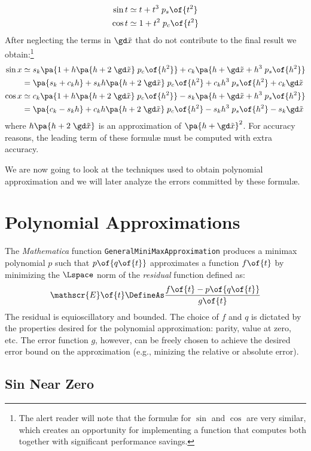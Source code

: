 \documentclass[10pt, a4paper, twoside]{basestyle}
\newcommand{\red}[1]{\tilde{#1}}
\begin{document}
\begin{align*}
\sin t &\simeq t + t^3 \; p_s\of{t^2} \\
\cos t &\simeq 1 + t^2 \; p_c\of{t^2}
\end{align*}
After neglecting the terms in $\gd \red x$ that do not contribute to the final result we obtain:\footnote{The alert reader will note that the formulæ for $\sin$ and $\cos$ are very similar, which creates an opportunity for implementing a function that computes both together with significant performance savings.}
\begin{align*}
\sin x &\simeq s_k \pa{1 + h \pa{h + 2 \; \gd \red x} \; p_c\of{h^2}} + c_k \pa{h + \gd \red x + h^3 \; p_s\of{h^2}} \\
&= \pa{s_k + c_k h} + s_k h \pa{h + 2 \; \gd \red x} \; p_c\of{h^2} + c_k h^3 \; p_s\of{h^2} + c_k \gd \red x \\
\cos x &\simeq c_k \pa{1 + h \pa{h + 2 \; \gd \red x} \; p_c\of{h^2}} - s_k \pa{h + \gd \red x + h^3 \; p_s\of{h^2}} \\
&= \pa{c_k - s_k h} + c_k h \pa{h + 2 \; \gd \red x} \; p_c\of{h^2} - s_k h^3 \; p_s\of{h^2} - s_k \gd \red x
\end{align*}
where $h \pa{h + 2 \; \gd \red x}$ is an approximation of $\pa{h + \gd \red x}^2$.  For accuracy reasons, the leading term of these formulæ must be computed with extra accuracy.

We are now going to look at the techniques used to obtain polynomial approximation and we will later analyze the errors committed by these formulæ.

\section*{Polynomial Approximations}

The \textit{Mathematica} function \texttt{GeneralMiniMaxApproximation} produces a minimax polynomial $p$ such that $p\of{q\of{t}}$ approximates a function $f\of{t}$ by minimizing the $\Lspace$ norm of the \emph{residual} function defined as:
\[
\mathscr{E}\of{t} \DefineAs \frac{f\of{t} - p\of{q\of{t}}}{g\of{t}}
\]
The residual is equioscillatory and bounded.  The choice of $f$ and $q$ is dictated by the properties desired for the polynomial approximation: parity, value at zero, etc.  The error function $g$, however, can be freely chosen to achieve the desired error bound on the approximation (e.g., minizing the relative or absolute error).

\subsection*{Sin Near Zero}
\end{document}
